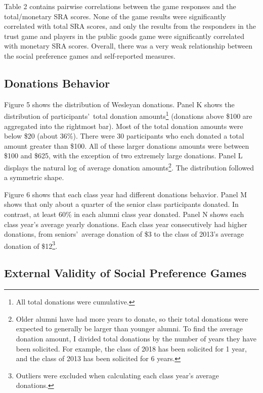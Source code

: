 \documentclass[12pt]{article}
\begin{document}
Table 2 contains pairwise correlations between the game responses and the total/monetary SRA scores. None of the game results were significantly correlated with total SRA scores, and only the results from the responders in the trust game and players in the public goods game were significantly correlated with monetary SRA scores. Overall, there was a very weak relationship between the social preference games and self-reported measures. 

\subsection{Donations Behavior}

Figure 5 shows the distribution of Wesleyan donations. Panel K shows the distribution of participants\rq \ total donation amounts\footnote{All total donations were cumulative.} (donations above \$100 are aggregated into the rightmost bar). Most of the total donation amounts were below \$20 (about 36\%). There were 30 participants who each donated a total amount greater than \$100. All of these larger donations amounts were between \$100 and \$625, with the exception of two extremely large donations. Panel L displays the natural log of average donation amounts\footnote{Older alumni have had more years to donate, so their total donations were expected to generally be larger than younger alumni. To find the average donation amount, I divided total donations by the number of years they have been solicited. For example, the class of 2018 has been solicited for 1 year, and the class of 2013 has been solicited for 6 years.}. The distribution followed a symmetric shape.

Figure 6 shows that each class year had different donations behavior. Panel M shows that only about a quarter of the senior class participants donated. In contrast, at least 60\% in each alumni class year donated. Panel N shows each class year\rq s average yearly donations. Each class year consecutively had higher donations, from seniors\rq \ average donation of \$3 to the class of 2013\rq s average donation of \$12\footnote{Outliers were excluded when calculating each class year\rq s average donations.}.


\subsection{External Validity of Social Preference Games}
\end{document}
